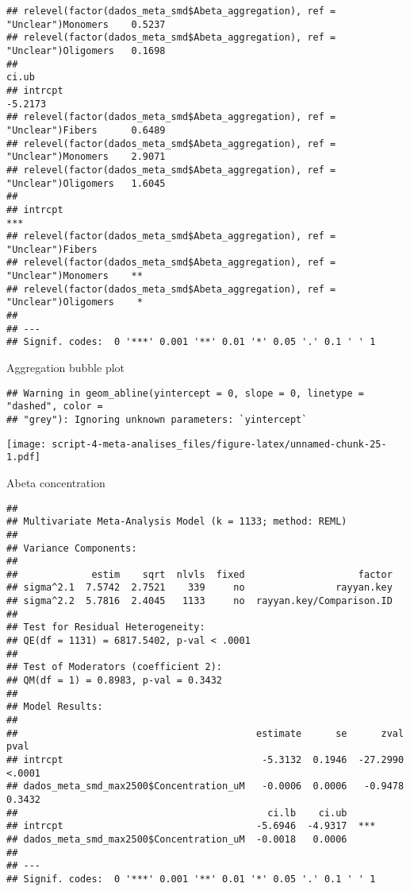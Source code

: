 \documentclass[
]{article}
\begin{document}
\begin{verbatim}
## relevel(factor(dados_meta_smd$Abeta_aggregation), ref = "Unclear")Monomers    0.5237 
## relevel(factor(dados_meta_smd$Abeta_aggregation), ref = "Unclear")Oligomers   0.1698 
##                                                                                ci.ub 
## intrcpt                                                                      -5.2173 
## relevel(factor(dados_meta_smd$Abeta_aggregation), ref = "Unclear")Fibers      0.6489 
## relevel(factor(dados_meta_smd$Abeta_aggregation), ref = "Unclear")Monomers    2.9071 
## relevel(factor(dados_meta_smd$Abeta_aggregation), ref = "Unclear")Oligomers   1.6045 
##                                                                                  
## intrcpt                                                                      *** 
## relevel(factor(dados_meta_smd$Abeta_aggregation), ref = "Unclear")Fibers         
## relevel(factor(dados_meta_smd$Abeta_aggregation), ref = "Unclear")Monomers    ** 
## relevel(factor(dados_meta_smd$Abeta_aggregation), ref = "Unclear")Oligomers    * 
## 
## ---
## Signif. codes:  0 '***' 0.001 '**' 0.01 '*' 0.05 '.' 0.1 ' ' 1
\end{verbatim}

Aggregation bubble plot

\begin{verbatim}
## Warning in geom_abline(yintercept = 0, slope = 0, linetype = "dashed", color =
## "grey"): Ignoring unknown parameters: `yintercept`
\end{verbatim}

\texttt{[image: script-4-meta-analises\_files/figure-latex/unnamed-chunk-25-1.pdf]}

Abeta concentration

\begin{verbatim}
## 
## Multivariate Meta-Analysis Model (k = 1133; method: REML)
## 
## Variance Components:
## 
##             estim    sqrt  nlvls  fixed                    factor 
## sigma^2.1  7.5742  2.7521    339     no                rayyan.key 
## sigma^2.2  5.7816  2.4045   1133     no  rayyan.key/Comparison.ID 
## 
## Test for Residual Heterogeneity:
## QE(df = 1131) = 6817.5402, p-val < .0001
## 
## Test of Moderators (coefficient 2):
## QM(df = 1) = 0.8983, p-val = 0.3432
## 
## Model Results:
## 
##                                          estimate      se      zval    pval 
## intrcpt                                   -5.3132  0.1946  -27.2990  <.0001 
## dados_meta_smd_max2500$Concentration_uM   -0.0006  0.0006   -0.9478  0.3432 
##                                            ci.lb    ci.ub      
## intrcpt                                  -5.6946  -4.9317  *** 
## dados_meta_smd_max2500$Concentration_uM  -0.0018   0.0006      
## 
## ---
## Signif. codes:  0 '***' 0.001 '**' 0.01 '*' 0.05 '.' 0.1 ' ' 1
\end{verbatim}
\end{document}

